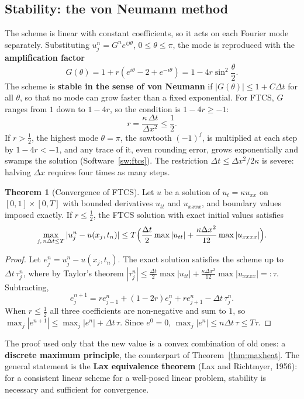 \documentclass[11pt,a4paper]{article}
\numberwithin{equation}{section}
\theoremstyle{definition}
\newtheorem{thm}{Theorem}[subsection]
\begin{document}
\subsection{Stability: the von Neumann method}
\label{ssec:vonneumann}

The scheme is linear with constant coefficients, so it acts on each Fourier mode separately. Substituting $u_j^n = G^ne^{ij\theta}$, $0 \leq \theta \leq \pi$, the mode is reproduced with the \textbf{amplification factor}
\[
G(\theta) = 1 + r(e^{i\theta} - 2 + e^{-i\theta}) = 1 - 4r\sin^2\frac\theta2 .
\]
The scheme is \textbf{stable in the sense of von Neumann} if $|G(\theta)| \leq 1 + C\Delta t$ for all $\theta$, so that no mode can grow faster than a fixed exponential. For FTCS, $G$ ranges from $1$ down to $1 - 4r$, so the condition is $1 - 4r \geq -1$:
\[
r = \frac{\kappa\,\Delta t}{\Delta x^2} \leq \frac12 .
\]
If $r > \frac12$, the highest mode $\theta = \pi$, the sawtooth $(-1)^j$, is multiplied at each step by $1 - 4r < -1$, and any trace of it, even rounding error, grows exponentially and swamps the solution (Software~\ref{sw:ftcs}). The restriction $\Delta t \leq \Delta x^2/2\kappa$ is severe: halving $\Delta x$ requires four times as
many steps.

\begin{thm}[Convergence of FTCS]
\label{thm:ftcsconv}
Let $u$ be a solution of $u_t = \kappa u_{xx}$ on $[0, 1] \times [0, T]$ with bounded derivatives $u_{tt}$ and $u_{xxxx}$, and boundary values imposed exactly. If $r \leq \frac12$, the FTCS solution with exact initial values satisfies
\[
\max_{j,\,n\Delta t \leq T}|u_j^n - u(x_j, t_n)| \leq T\Bigl(\frac{\Delta t}2\max|u_{tt}| + \frac{\kappa\Delta x^2}{12}\max|u_{xxxx}|\Bigr) .
\]
\end{thm}

\begin{proof}
Let $e_j^n = u_j^n - u(x_j, t_n)$. The exact solution satisfies the scheme up to $\Delta t\,\tau_j^n$, where by Taylor's theorem $|\tau_j^n| \leq \frac{\Delta t}2\max|u_{tt}| + \frac{\kappa\Delta x^2}{12}\max|u_{xxxx}| =: \tau$. Subtracting,
\[
e_j^{n + 1} = re_{j - 1}^n + (1 - 2r)e_j^n + re_{j + 1}^n - \Delta t\,\tau_j^n .
\]
When $r \leq \frac12$ all three coefficients are non-negative and sum to $1$, so $\max_j|e^{n + 1}| \leq \max_j|e^n| + \Delta t\,\tau$. Since $e^0 = 0$, $\max_j|e^n| \leq n\Delta t\,\tau \leq T\tau$.
\end{proof}

The proof used only that the new value is a convex combination of old ones: a \textbf{discrete maximum principle}, the counterpart of Theorem~\ref{thm:maxheat}. The general statement is the \textbf{Lax equivalence theorem} (Lax and Richtmyer, 1956): for a consistent linear scheme for a well-posed linear problem,
stability is necessary and sufficient for convergence.
\end{document}
